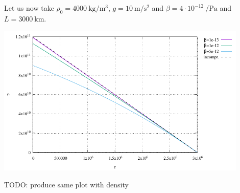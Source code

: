 Let us now take $\rho_0=\SI{4000}{\kg\per\cubic\meter}$, 
$g=\SI{10}{\meter\per\square\second}$ and $\beta=4\cdot 10^{-12}~\si{\per\pascal}$ \cite{gadb20} 
and $L=3000~\si{\km}$.

\begin{center}
\includegraphics[width=12cm]{images/density_profile/pressure}
\end{center}

TODO: produce same plot with density
